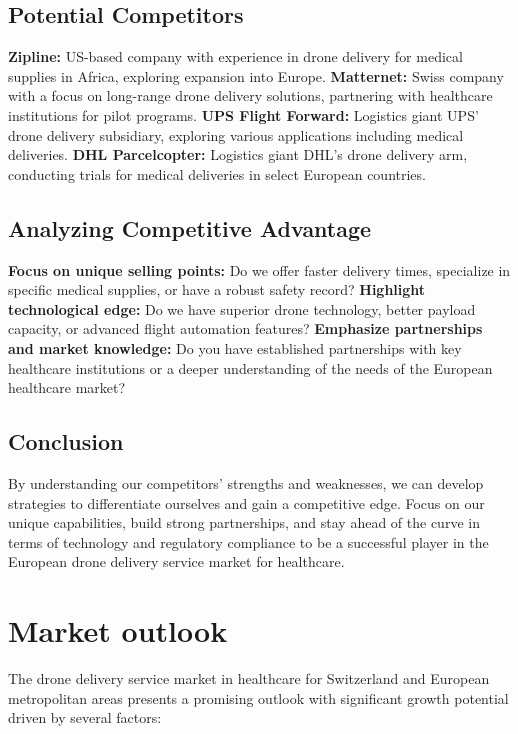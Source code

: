 \subsection{Potential Competitors}
\textbf{Zipline:} US-based company with experience in drone delivery for medical supplies in Africa, exploring expansion into Europe.
\newline
\textbf{Matternet:} Swiss company with a focus on long-range drone delivery solutions, partnering with healthcare institutions for pilot programs.
\newline
\textbf{UPS Flight Forward:} Logistics giant UPS' drone delivery subsidiary, exploring various applications including medical deliveries.
\newline
\textbf{DHL Parcelcopter:} Logistics giant DHL's drone delivery arm, conducting trials for medical deliveries in select European countries.
\subsection{Analyzing Competitive Advantage}
\textbf{Focus on unique selling points:} Do we offer faster delivery times, specialize in specific medical supplies, or have a robust safety record?
\newline
\textbf{Highlight technological edge:} Do we have superior drone technology, better payload capacity, or advanced flight automation features?
\newline
\textbf{Emphasize partnerships and market knowledge:} Do you have established partnerships with key healthcare institutions or a deeper understanding of the needs of the European healthcare market?
\subsection{Conclusion}
By understanding our competitors' strengths and weaknesses, we can develop strategies to differentiate ourselves and gain a competitive edge. Focus on our unique capabilities, build strong partnerships, and stay ahead of the curve in terms of technology and regulatory compliance to be a successful player in the European drone delivery service market for healthcare.

\section{Market outlook}
The drone delivery service market in healthcare for Switzerland and European metropolitan areas presents a promising outlook with significant growth potential driven by several factors:
